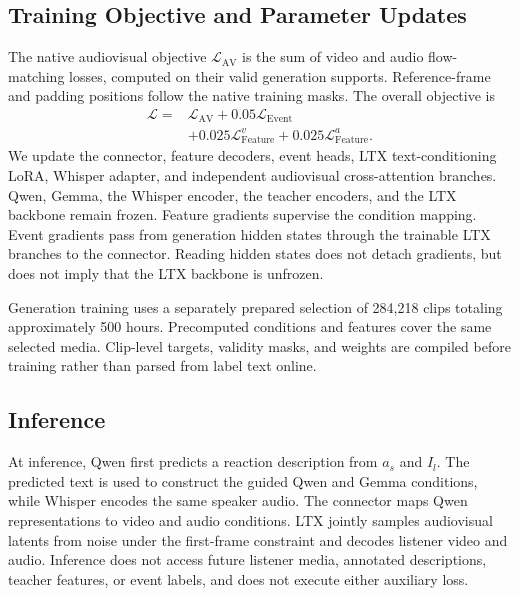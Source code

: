 \subsection{Training Objective and Parameter Updates}
\label{sec:training}
The native audiovisual objective $\mathcal L_{\mathrm{AV}}$ is the sum of video and audio flow-matching losses, computed on their valid generation supports. Reference-frame and padding positions follow the native training masks. The overall objective is
\begin{equation}
\begin{split}
\mathcal L ={}& \mathcal L_{\mathrm{AV}} + 0.05\mathcal L_{\mathrm{Event}}\\
&+0.025\mathcal L_{\mathrm{Feature}}^v
 +0.025\mathcal L_{\mathrm{Feature}}^a.
\end{split}
\label{eq:total}
\end{equation}
We update the connector, feature decoders, event heads, LTX text-conditioning LoRA, Whisper adapter, and independent audiovisual cross-attention branches. Qwen, Gemma, the Whisper encoder, the teacher encoders, and the LTX backbone remain frozen. Feature gradients supervise the condition mapping. Event gradients pass from generation hidden states through the trainable LTX branches to the connector. Reading hidden states does not detach gradients, but does not imply that the LTX backbone is unfrozen.

Generation training uses a separately prepared selection of 284,218 clips totaling approximately 500 hours. Precomputed conditions and features cover the same selected media. Clip-level targets, validity masks, and weights are compiled before training rather than parsed from label text online.

\subsection{Inference}
At inference, Qwen first predicts a reaction description from $a_s$ and $I_l$. The predicted text is used to construct the guided Qwen and Gemma conditions, while Whisper encodes the same speaker audio. The connector maps Qwen representations to video and audio conditions. LTX jointly samples audiovisual latents from noise under the first-frame constraint and decodes listener video and audio. Inference does not access future listener media, annotated descriptions, teacher features, or event labels, and does not execute either auxiliary loss.
